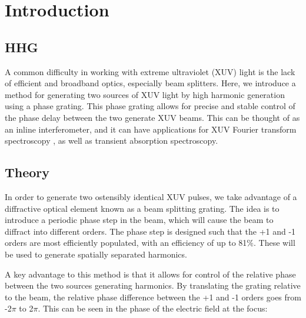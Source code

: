 \chapter{Introduction}
\label{Intro}

\section{HHG}
\label{intro_HHG}

A common difficulty in working with extreme ultraviolet (XUV) light is the lack of efficient and broadband optics, especially beam splitters. Here, we introduce a method for generating two sources of XUV light by high harmonic generation using a phase grating.  This phase grating allows for precise and stable control of the phase delay between the two generate XUV beams.  This can be thought of as an inline interferometer, and it can have applications for XUV Fourier transform spectroscopy , as well as transient absorption spectroscopy.

\section{Theory}
\label{theory_ts}

In order to generate two ostensibly identical XUV pulses, we take advantage of a diffractive optical element known as a beam splitting grating.   The idea is to introduce a periodic phase step in the beam, which will cause the beam to diffract into different orders.  The phase step is designed such that the +1 and -1 orders are most efficiently populated, with an efficiency of up to 81$\%$.  These will be used to generate spatially separated harmonics.

A key advantage to this method is that it allows for control of the relative phase between the two sources generating harmonics.  By translating the grating relative to the beam, the relative phase difference between the +1 and -1 orders goes from -2$\pi$ to 2$\pi$.  This can be seen in the phase of the electric field at the focus:


